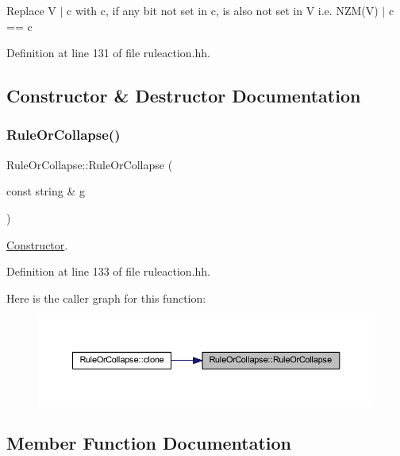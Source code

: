 Replace V $\vert$ c with c, if any bit not set in c, is also not set in V i.\+e. N\+Z\+M(\+V) $\vert$ c == c 

Definition at line 131 of file ruleaction.\+hh.



\subsection{Constructor \& Destructor Documentation}
\mbox{\label{class_rule_or_collapse_ad245da909df1ba1f6db108103fdf2bb9}} 
\subsubsection{\texorpdfstring{RuleOrCollapse()}{RuleOrCollapse()}}
{\footnotesize\ttfamily Rule\+Or\+Collapse\+::\+Rule\+Or\+Collapse (\begin{DoxyParamCaption}\item[{const string \&}]{g }\end{DoxyParamCaption})\hspace{0.3cm}{\ttfamily [inline]}}



\mbox{\hyperlink{class_constructor}{Constructor}}. 



Definition at line 133 of file ruleaction.\+hh.

Here is the caller graph for this function\+:
\nopagebreak
\begin{figure}[H]
\begin{center}
\leavevmode
\includegraphics[width=350pt]{class_rule_or_collapse_ad245da909df1ba1f6db108103fdf2bb9_icgraph}
\end{center}
\end{figure}


\subsection{Member Function Documentation}
\mbox{\label{class_rule_or_collapse_a2b43549e7241357eb9b4c22857270ba1}} 
